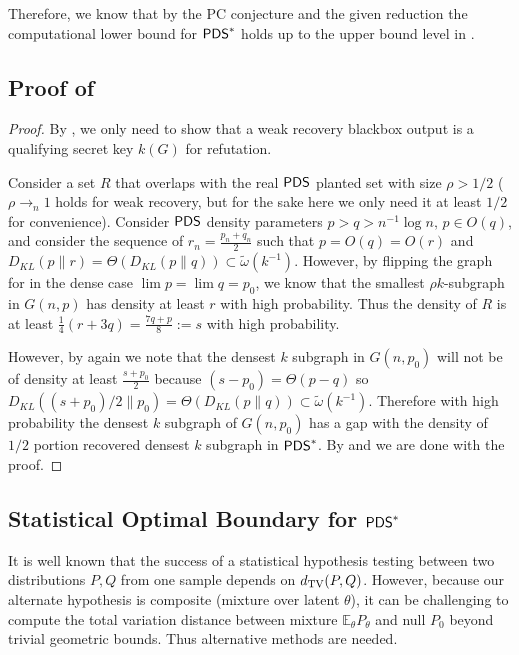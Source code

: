 \documentclass[final,12pt]{colt2023} %
\newcommand\1[1]{\mathbb{I}_{\left\{#1\right\}}}
\begin{document}
\spac Therefore, we know that by the PC conjecture and the given reduction the computational lower bound for $\mathsf{PDS}^*$ holds up to the upper bound level in . 
\subsection{Proof of }
\begin{proof}
By , we only need to show that a weak recovery blackbox output is a qualifying secret key $k(G)$ for refutation.

\spac Consider a set $R$ that overlaps with the real $\mathsf{PDS}$ planted set with size $\rho>1/2$ ($\rho\to_n 1$ holds for weak recovery, but for the sake here we only need it at least $1/2$ for convenience). Consider $\mathsf{PDS}$ density parameters $p>q>n^{-1}\log n,\, p\in O(q)$, and consider the sequence of $r_n=\frac{p_n+q_n}{2}$ such that $p=O(q)=O(r)$ and $D_{KL}(p\|r)=\Theta(D_{KL}(p\| q))\subset\tilde\omega(k^{-1})$. However, by flipping the graph for  in the dense case $\lim p=\lim q=p_0$, we know that the smallest $\rho k$-subgraph in $G(n, p)$ has density at least $r$ with high probability. Thus the density of $R$ is at least $\frac{1}{4}(r+3q)=\frac{7q+p}{8}:=s$ with high probability.

\spac However, by  again we note that the densest $k$ subgraph in $G(n, p_0)$ will not be of density at least $\frac{s+p_0}{2}$ because $(s-p_0)=\Theta(p-q)$ so $D_{KL}((s+p_0)/2\| p_0)=\Theta(D_{KL}(p\| q))\subset\tilde\omega(k^{-1})$. Therefore with high probability the densest $k$ subgraph of $G(n, p_0)$ has a gap with the density of $1/2$ portion recovered densest $k$ subgraph in $\mathsf{PDS}^*$. By  and  we are done with the proof.
\end{proof}
\subsection{Statistical Optimal Boundary for $\mathsf{PDS}^*$}
 It is well known that the success of a statistical hypothesis testing between two distributions $P, Q$ from one sample depends on $d_{\rm TV}(P, Q)$. However, because our alternate hypothesis is composite (mixture over latent $\theta$), it can be challenging to compute the total variation distance between mixture $\mathbb{E}_{\theta} P_\theta$ and null $P_0$ beyond trivial geometric bounds. Thus alternative methods are needed.
 
\end{document}
